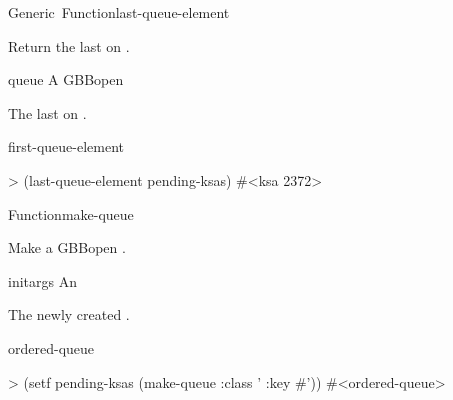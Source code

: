 \documentclass[10pt,twoside,english,pdftex]{article}
\begin{document}
\begin{functiondoc}{Generic~Function}{last-queue-element}{
    \returns{} }
%

\fnsyntax

\fnpurpose Return the last  on .

\fnmethods
{}

\fnpackage {}

\fnmodule {}

\fnargs
\begin{args}{queue}
\arg[queue] A GBBopen 
\end{args}

\fnreturns The last  on .
  
\begin{alsos}{first-queue-element}
\end{alsos}

\fnexample
%
\W\supp
\begin{example}
> (last-queue-element pending-ksas)
#<ksa 2372>
\end{example}

\end{functiondoc}


\begin{functiondoc}{Function}{make-queue}{ 
    \returns{} }
%
%
%

\fnsyntax

\fnpurpose Make a GBBopen .

\fnpackage {}

\fnmodule {}

\fnargs
\begin{args}{initargs}
\arg[initargs] An 
\end{args}

\fnreturns The newly created .
  
\begin{alsos}{ordered-queue}
\also[queue]
\end{alsos}

\fnexample
{}%
%
%
\W\supp
\begin{example}
> (setf pending-ksas (make-queue :class '
                                 :key #'))
#<ordered-queue>
\end{example}

\end{functiondoc}
\end{document}
